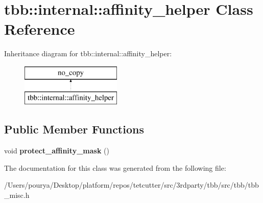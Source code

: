 \hypertarget{classtbb_1_1internal_1_1affinity__helper}{}\section{tbb\+:\+:internal\+:\+:affinity\+\_\+helper Class Reference}
\label{classtbb_1_1internal_1_1affinity__helper}
Inheritance diagram for tbb\+:\+:internal\+:\+:affinity\+\_\+helper\+:\begin{figure}[H]
\begin{center}
\leavevmode
\includegraphics[height=2.000000cm]{classtbb_1_1internal_1_1affinity__helper}
\end{center}
\end{figure}
\subsection*{Public Member Functions}
\begin{DoxyCompactItemize}
\item 
\hypertarget{classtbb_1_1internal_1_1affinity__helper_a36682cf099cfd2b2f0120c23fa179a81}{}void {\bfseries protect\+\_\+affinity\+\_\+mask} ()\label{classtbb_1_1internal_1_1affinity__helper_a36682cf099cfd2b2f0120c23fa179a81}

\end{DoxyCompactItemize}


The documentation for this class was generated from the following file\+:\begin{DoxyCompactItemize}
\item 
/\+Users/pourya/\+Desktop/platform/repos/tetcutter/src/3rdparty/tbb/src/tbb/tbb\+\_\+misc.\+h\end{DoxyCompactItemize}
